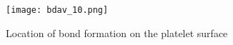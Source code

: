 \documentclass{article}
\newcommand{\tn}{\textnormal}
\begin{document}
\begin{figure}[h]
  \centering
  \texttt{[image: bdav\_10.png]}
  \caption{Location of bond formation on the platelet surface}
  \label{fig:bd-loc}
\end{figure}


\end{document}
